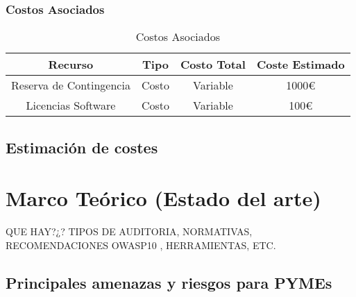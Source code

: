 \documentclass[a4paper, 10pt]{article}
\begin{document}
\subsubsection{Costos Asociados}

\begin{table}[H]
\centering
\renewcommand{\arraystretch}{1.5}
\begin{tabular}{|c|c|c|c|}
\hline
\textbf{Recurso} & \textbf{Tipo} & \textbf{Costo Total} & \textbf{Coste Estimado}  \\ \hline
Reserva de Contingencia & Costo & Variable & 1000€  \\ \hline
Licencias Software & Costo & Variable &  100€ \\ \hline
\end{tabular}
\caption{Costos Asociados}
\label{tab:costos_asociados}
\end{table}



\subsection{Estimación de costes}





\clearpage































\section{Marco Teórico (Estado del arte)}
QUE HAY?¿? TIPOS DE AUDITORIA, NORMATIVAS, RECOMENDACIONES OWASP10 , HERRAMIENTAS, ETC.
\subsection{Principales amenazas y riesgos para PYMEs}
\end{document}
